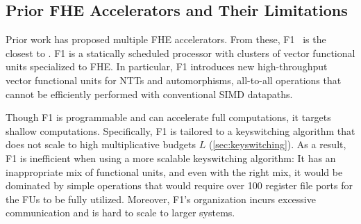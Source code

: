 \begin{comment}
\paragraph{Putting it all together:} \autoref{listing:homomorphicMult} shows the implementation 
of homomorphic multiplication in CKKS using the above techniques. Each of the input ciphertexts (\verb|a| and \verb|b|)
consist of two ciphertext polynomials, and each ciphertext polynomial has $L$ residue polynomials (e.g., \texttt{a$\textsubscript{1}$[0:L]}).
Each residue polynomial is an $N$-coefficient vector (the code is written using vector operations and $N$ is implicit).
Inputs and outputs are in the NTT domain.
The homomorphic multiplication consists of additions and multiplications of these inputs, followed by a \emph{keyswitch} (which we will detail later, and dominates execution for large $L$).
Finally, \emph{rescaling} trims the noise of the resulting ciphertext (and drops one of 
the $L$ residue polynomials).
\end{comment}

\subsection{Prior FHE Accelerators and Their Limitations}\label{sec:drawbacks}

Prior work has proposed multiple FHE accelerators.
From these, F1~\cite{feldmann:micro21:f1} is the closest to \name.
F1 is a statically scheduled processor with clusters of vector functional units
specialized to FHE. In particular, F1 introduces new high-throughput vector 
functional units for NTTs and automorphisms, all-to-all operations that cannot 
be efficiently performed with conventional SIMD datapaths.

Though F1 is programmable and can accelerate full computations,
it targets shallow computations.
Specifically, F1 is tailored to a keyswitching algorithm
that does not scale to high multiplicative budgets $L$ (\autoref{sec:keyswitching}).
As a result, F1 is inefficient when using a more scalable keyswitching algorithm: It has an inappropriate mix of functional units, and
even with the right mix, it would be dominated by simple operations that would require over 100 register file ports for the FUs to be fully utilized.
Moreover, F1's organization incurs excessive communication and is hard to scale to larger systems.

